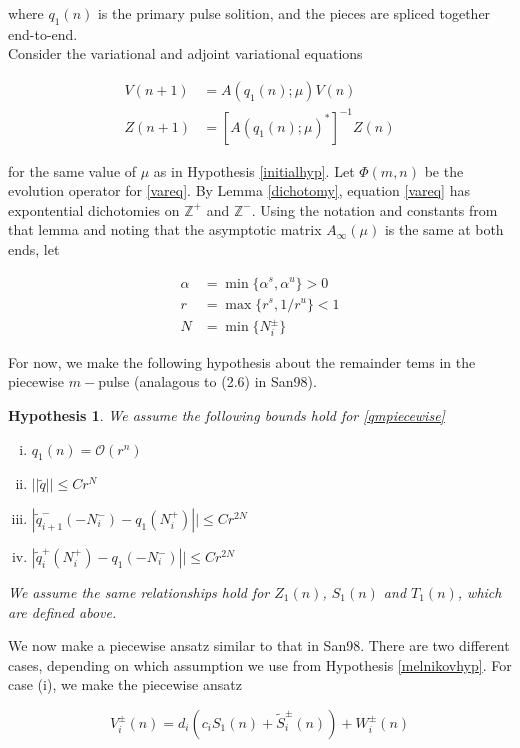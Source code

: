 \documentclass[12pt]{article}
\def\Z{{\mathbb Z}}
\newtheorem{hypothesis}{Hypothesis}
\begin{document}
where $q_1(n)$ is the primary pulse solition, and the pieces are spliced together end-to-end.\\

Consider the variational and adjoint variational equations

\begin{align}
V(n+1) &= A(q_1(n); \mu) V(n) \label{vareq} \\
Z(n+1) &= [A(q_1(n); \mu)^*]^{-1} Z(n) \label{adjvareq}
\end{align}

for the same value of $\mu$ as in Hypothesis \ref{initialhyp}. Let $\Phi(m, n)$ be the evolution operator for \eqref{vareq}. By Lemma \ref{dichotomy}, equation \eqref{vareq} has expontential dichotomies on $\Z^+$ and $\Z^-$. Using the notation and constants from that lemma and noting that the asymptotic matrix $A_\infty(\mu)$ is the same at both ends, let

\begin{align*}
\alpha &= \min \{ \alpha^s, \alpha^u \} > 0 \\
r &= \max \{ r^s, 1/r^u \} < 1 \\
N &= \min \{ N_i^\pm \}
\end{align*}

For now, we make the following hypothesis about the remainder tems in the piecewise $m-$pulse (analagous to (2.6) in San98).

\begin{hypothesis}\label{qbounds}We assume the following bounds hold for \eqref{qmpiecewise}
\begin{enumerate}[(i)]
\item $q_1(n) = \mathcal{O}(r^n)$
\item $||\tilde{q}|| \leq C r^N$
\item $|\tilde{q}_{i+1}^-(-N_i^-) - q_1(N_i^+)|| \leq C r^{2N}$ 
\item $|\tilde{q}_i^+(N_i^+) - q_1(-N_i^-)|| \leq C r^{2N}$
\end{enumerate}
We assume the same relationships hold for $Z_1(n)$, $S_1(n)$ and $T_1(n)$, which are defined above.
\end{hypothesis}

We now make a piecewise ansatz similar to that in San98. There are two different cases, depending on which assumption we use from Hypothesis \ref{melnikovhyp}. For case (i), we make the piecewise ansatz

\[
V_i^\pm(n) = d_i ( c_i S_1(n) + \tilde{S}_i^\pm(n) ) + W_i^\pm(n)
\]
\end{document}
